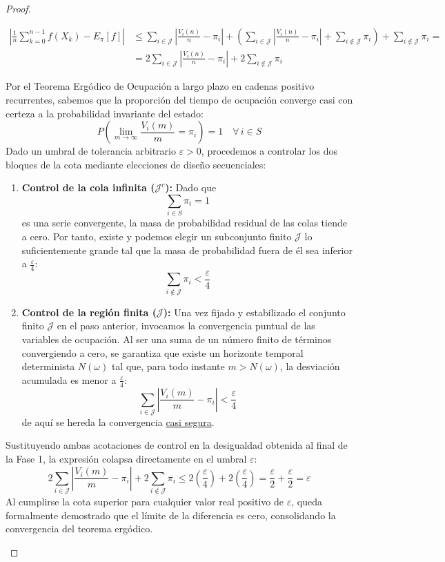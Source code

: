 \begin{coro}
\begin{proof}
\begin{description}
\begin{align*}
            \left| \frac{1}{n} \sum_{k=0}^{n-1} f(X_k) - E_{\pi}[f] \right|&\le \sum_{i \in \mathcal{J}} \left| \frac{V_i(n)}{n} - \pi_i \right| + \left( \sum_{i \in \mathcal{J}} \left| \frac{V_i(n)}{n} - \pi_i \right| + \sum_{i \notin \mathcal{J}} \pi_i \right) + \sum_{i \notin \mathcal{J}} \pi_i= \\
            &= 2 \sum_{i \in \mathcal{J}} \left| \frac{V_i(n)}{n} - \pi_i \right| + 2 \sum_{i \notin \mathcal{J}} \pi_i
        \end{align*}
    \item[\tbf{Fase 2.}] Por el Teorema Ergódico de Ocupación a largo plazo en cadenas positivo recurrentes, sabemos que la proporción del tiempo de ocupación converge casi con certeza a la probabilidad invariante del estado:
        \[
        P\left(\lim_{m \to \infty} \frac{V_i(m)}{m} = \pi_i\right) = 1 \quad \forall \, i \in S
        \]
        Dado un umbral de tolerancia arbitrario $\varepsilon > 0$, procedemos a controlar los dos bloques de la cota mediante elecciones de diseño secuenciales:

        \begin{enumerate}
            \item \textbf{Control de la cola infinita ($\mathcal{J}^c$):} Dado que 
            $$\sum_{i \in S} \pi_i = 1$$ 
            es una serie convergente, la masa de probabilidad residual de las colas tiende a cero. Por tanto, existe y podemos elegir un subconjunto finito $\mathcal{J}$ lo suficientemente grande tal que la masa de probabilidad fuera de él sea inferior a $\frac{\varepsilon}{4}$:
            \[
            \sum_{i \notin \mathcal{J}} \pi_i < \frac{\varepsilon}{4}
            \]
            
            \item \textbf{Control de la región finita ($\mathcal{J}$):} Una vez fijado y estabilizado el conjunto finito $\mathcal{J}$ en el paso anterior, invocamos la convergencia puntual de las variables de ocupación. Al ser una suma de un número finito de términos convergiendo a cero, se garantiza que existe un horizonte temporal determinista $N(\omega)$ tal que, para todo instante $m > N(\omega)$, la desviación acumulada es menor a $\frac{\varepsilon}{4}$:
            \[
            \sum_{i \in \mathcal{J}} \left| \frac{V_i(m)}{m} - \pi_i \right| < \frac{\varepsilon}{4}
            \]
            de aquí se hereda la convergencia \underline{casi segura}.
        \end{enumerate}

        Sustituyendo ambas acotaciones de control en la desigualdad obtenida al final de la Fase 1, la expresión colapsa directamente en el umbral $\varepsilon$:
        \[
        2 \sum_{i \in \mathcal{J}} \left| \frac{V_i(m)}{m} - \pi_i \right| + 2 \sum_{i \notin \mathcal{J}} \pi_i \le 2 \left( \frac{\varepsilon}{4} \right) + 2 \left( \frac{\varepsilon}{4} \right) = \frac{\varepsilon}{2} + \frac{\varepsilon}{2} = \varepsilon
        \]
        Al cumplirse la cota superior para cualquier valor real positivo de $\varepsilon$, queda formalmente demostrado que el límite de la diferencia es cero, consolidando la convergencia del teorema ergódico.


\end{description}
\end{proof}
\end{coro}
